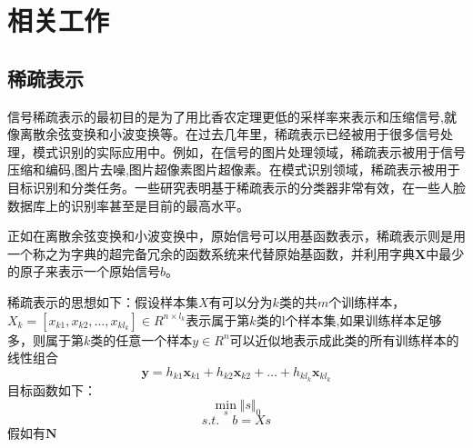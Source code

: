 \section{相关工作}
\subsection{稀疏表示}
 信号稀疏表示的最初目的是为了用比香农定理更低的采样率来表示和压缩信号\cite{de2011embedding},就像离散余弦变换和小波变换等。在过去几年里，稀疏表示已经被用于很多信号处理，模式识别的实际应用中。例如，在信号的图片处理领域，稀疏表示被用于信号压缩和编码\cite{marcellin2000overview},图片去噪\cite{elad2006image},图片超像素图片超像素\cite{yang2008image}。在模式识别领域，稀疏表示被用于目标识别和分类任务\cite{huang2006sparse,davenport2007smashed}。一些研究表明基于稀疏表示的分类器非常有效，在一些人脸数据库上的识别率甚至是目前的最高水平。

正如在离散余弦变换和小波变换中，原始信号可以用基函数表示，稀疏表示则是用一个称之为字典的超完备冗余的函数系统来代替原始基函数，并利用字典$\mathbf{X}$中最少的原子来表示一个原始信号$b$。

稀疏表示的思想如下\cite{殷俊2013核稀疏保持投影及生物特征识别应用}：假设样本集$X$有可以分为$k$类的共$m$个训练样本，$X_{k} = [x_{k1},x_{k2},\ldots,x_{kl_{k}}]\in R^{n\times l_{k}}$表示属于第$k$类的l个样本集,如果训练样本足够多，则属于第$k$类的任意一个样本$y\in R^{n}$可以近似地表示成此类的所有训练样本的线性组合
$$\mathbf{y}=h_{k1}\mathbf {x}_{k1}+h_{k2}\mathbf {x}_{k2}+\ldots+h_{kl_{k}}\mathbf {x}_{kl_{k}}$$
目标函数如下：
$$\min_{s}\Vert{s}\Vert_{0}$$
$$s.t. \quad b=Xs$$
假如有$\mathbf{N}$
